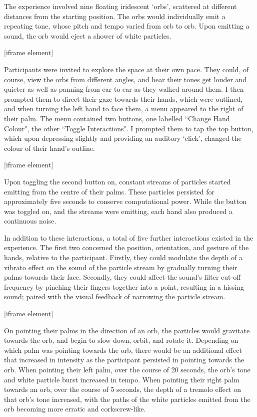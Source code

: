 The experience involved nine floating iridescent ‘orbs’, scattered at different distances from the starting position. The orbs would individually emit a repeating tone, whose pitch and tempo varied from orb to orb. Upon emitting a sound, the orb would eject a shower of white particles.

[iframe element]

Participants were invited to explore the space at their own pace. They could, of course, view the orbs from different angles, and hear their tones get louder and quieter as well as panning from ear to ear as they walked around them.
I then prompted them to direct their gaze towards their hands, which were outlined, and when turning the left hand to face them, a menu appeared to the right of their palm. The menu contained two buttons, one labelled ``Change Hand Colour", the other ``Toggle Interactions". I prompted them to tap the top button, which upon depressing slightly and providing an auditory ‘click’, changed the colour of their hand’s outline.

[iframe element]

Upon toggling the second button on, constant streams of particles started emitting from the centre of their palms. These particles persisted for approximately five seconds to conserve computational power. While the button was toggled on, and the streams were emitting, each hand also produced a continuous noise.

In addition to these interactions, a total of five further interactions existed in the experience. The first two concerned the position, orientation, and gesture of the hands, relative to the participant. Firstly, they could modulate the depth of a vibrato effect on the sound of the particle stream by gradually turning their palms towards their face. Secondly, they could affect the sound’s filter cut-off frequency by pinching their fingers together into a point, resulting in a hissing sound; paired with the visual feedback of narrowing the particle stream.

[iframe element]

On pointing their palms in the direction of an orb, the particles would gravitate towards the orb, and begin to slow down, orbit, and rotate it. Depending on which palm was pointing towards the orb, there would be an additional effect that increased in intensity as the participant persisted in pointing towards the orb. When pointing their left palm, over the course of 20 seconds, the orb’s tone and white particle burst increased in tempo. When pointing their right palm towards an orb, over the course of 5 seconds, the depth of a tremolo effect on that orb’s tone increased, with the paths of the white particles emitted from the orb becoming more erratic and corkscrew-like.

